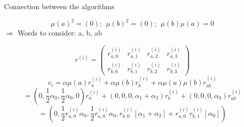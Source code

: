 \documentclass[rgb, pdf]{beamer}
\begin{document}
\begin{frame}[allowframebreaks]{Connection between the algorithms}
\begin{minipage}{0.3\textwidth}
\begin{center}
            \end{center}
            \end{minipage}
            
            \framebreak
            
            \[  \mu(a)^2 = (0);  \ \ \mu(b)^2 = (0); \ \ \mu(b) \mu(a) = 0  \]
            $\Rightarrow$ Words to consider: a, b, ab
            
            
            \[  r^{(i)}= \begin{pmatrix}
                        r^{(i)}_{a,0} & r^{(i)}_{a,1} & r^{(i)}_{a,2} & r^{(i)}_{a,3} \\
                        r^{(i)}_{b,0} & r^{(i)}_{b,1} & r^{(i)}_{b,2} & r^{(i)}_{b,3}
                    \end{pmatrix}                     
        \] \vspace{0.5cm}
        \[ v_i = \alpha \mu(a) r^{(i)}_a + \alpha \mu(b) r^{(i)}_b + \alpha \mu(a) \mu(b) r^{(i)}_{ab} \]
        \[= \left(0, \frac{1}{2} \alpha_0, \frac{1}{2} \alpha_0, 0\right) r^{(i)}_a + \left(0, 0, 0,\alpha_1 + \alpha_2\right) r^{(i)}_b + \left(0,0,0,\alpha_0\right) r^{(i)}_{ab} \]
        \[ = \left(0, \frac{1}{2} r^{(i)}_{a,0} \alpha_0, \frac{1}{2} r^{(i)}_{a,0} \alpha_0, r^{(i)}_{b,0} [\alpha_1 + \alpha_2] + r^{(i)}_{a,0} r^{(i)}_{b,1} [\alpha_0] \right) \]
        

\end{frame}
\end{document}

